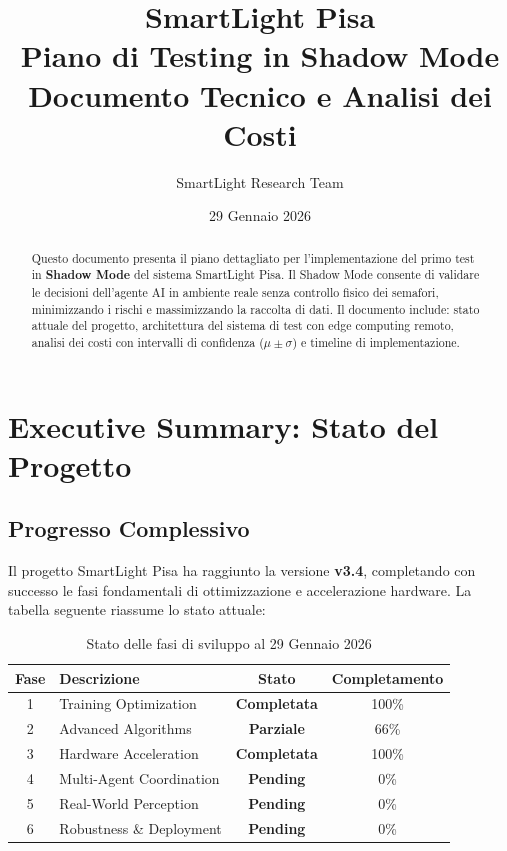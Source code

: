 \documentclass[a4paper,11pt]{article}
\title{
    \vspace{-1cm}
    \textbf{SmartLight Pisa}\\
    \Large Piano di Testing in Shadow Mode\\
    \large Documento Tecnico e Analisi dei Costi
}
\author{SmartLight Research Team}
\date{29 Gennaio 2026}
\begin{document}
\maketitle

\begin{abstract}
Questo documento presenta il piano dettagliato per l'implementazione del primo test in \textbf{Shadow Mode} del sistema SmartLight Pisa. Il Shadow Mode consente di validare le decisioni dell'agente AI in ambiente reale senza controllo fisico dei semafori, minimizzando i rischi e massimizzando la raccolta di dati. Il documento include: stato attuale del progetto, architettura del sistema di test con edge computing remoto, analisi dei costi con intervalli di confidenza ($\mu \pm \sigma$) e timeline di implementazione.
\end{abstract}

\tableofcontents
\newpage

\section{Executive Summary: Stato del Progetto}

\subsection{Progresso Complessivo}

Il progetto SmartLight Pisa ha raggiunto la versione \textbf{v3.4}, completando con successo le fasi fondamentali di ottimizzazione e accelerazione hardware. La tabella seguente riassume lo stato attuale:

\begin{table}[H]
    \centering
    \begin{tabular}{clcc}
        \toprule
        \textbf{Fase} & \textbf{Descrizione} & \textbf{Stato} & \textbf{Completamento} \\
        \midrule
        1 & Training Optimization & \textcolor{completed}{\textbf{Completata}} & 100\% \\
        2 & Advanced Algorithms & \textcolor{partial}{\textbf{Parziale}} & 66\% \\
        3 & Hardware Acceleration & \textcolor{completed}{\textbf{Completata}} & 100\% \\
        4 & Multi-Agent Coordination & \textcolor{pending}{\textbf{Pending}} & 0\% \\
        5 & Real-World Perception & \textcolor{pending}{\textbf{Pending}} & 0\% \\
        6 & Robustness \& Deployment & \textcolor{pending}{\textbf{Pending}} & 0\% \\
        \bottomrule
    \end{tabular}
    \caption{Stato delle fasi di sviluppo al 29 Gennaio 2026}
\end{table}
\end{document}
